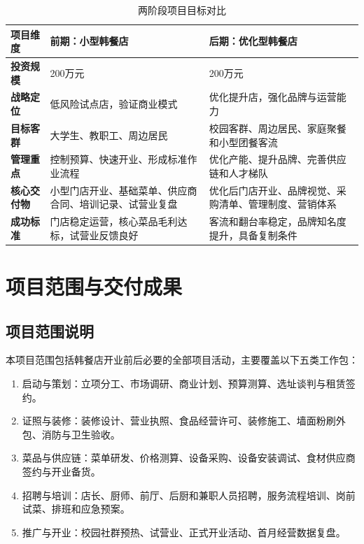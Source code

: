 \documentclass[UTF8,zihao=-4]{ctexart}
\begin{document}
\begin{table}[H]
  \centering
  \caption{两阶段项目目标对比}
  \begin{tabularx}{\textwidth}{>{\bfseries}p{2.4cm}YY}
    \toprule
    项目维度 & 前期：小型韩餐店 & 后期：优化型韩餐店 \\
    \midrule
    投资规模 & 200万元 & 200万元 \\
    战略定位 & 低风险试点店，验证商业模式 & 优化提升店，强化品牌与运营能力 \\
    目标客群 & 大学生、教职工、周边居民 & 校园客群、周边居民、家庭聚餐和小型团餐客流 \\
    管理重点 & 控制预算、快速开业、形成标准作业流程 & 优化产能、提升品牌、完善供应链和人才梯队 \\
    核心交付物 & 小型门店开业、基础菜单、供应商合同、培训记录、试营业复盘 & 优化后门店开业、品牌视觉、采购清单、管理制度、营销体系 \\
    成功标准 & 门店稳定运营，核心菜品毛利达标，试营业反馈良好 & 客流和翻台率稳定，品牌知名度提升，具备复制条件 \\
    \bottomrule
  \end{tabularx}
\end{table}

\section{项目范围与交付成果}

\subsection{项目范围说明}

本项目范围包括韩餐店开业前后必要的全部项目活动，主要覆盖以下五类工作包：

\begin{enumerate}
  \item 启动与策划：立项分工、市场调研、商业计划、预算测算、选址谈判与租赁签约。
  \item 证照与装修：装修设计、营业执照、食品经营许可、装修施工、墙面粉刷外包、消防与卫生验收。
  \item 菜品与供应链：菜单研发、价格测算、设备采购、设备安装调试、食材供应商签约与开业备货。
  \item 招聘与培训：店长、厨师、前厅、后厨和兼职人员招聘，服务流程培训、岗前试菜、排班和应急预案。
  \item 推广与开业：校园社群预热、试营业、正式开业活动、首月经营数据复盘。
\end{enumerate}
\end{document}
